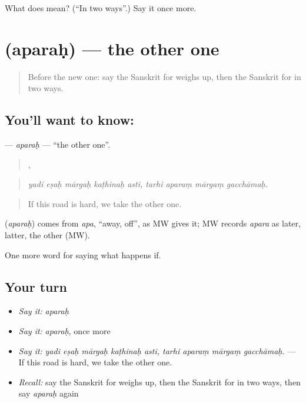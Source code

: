 \begin{tcolorbox}[breakable,colback=teal!4,colframe=teal!35!black,title={Before you move on}]
What does  mean? (\textquotedblleft{}In two ways\textquotedblright{}.) Say it once more.
\end{tcolorbox}
\section[\texorpdfstring{\sk{अपरः} (aparaḥ)}{अपरः (aparaḥ)}]{ (aparaḥ) — the other one}

\label{lesson:SA-C541-aparah}



\begin{quote}
Before the new one: say the Sanskrit for weighs up, then the Sanskrit for in two ways.
\end{quote}

\subsection*{You'll want to know: }
\textbf{} — \emph{aparaḥ} — \textquotedblleft{}the other one\textquotedblright{}.

\begin{quote}
    ,    
\end{quote}

\begin{quote}
\emph{yadi eṣaḥ mārgaḥ kaṭhinaḥ asti, tarhi aparaṃ mārgaṃ gacchāmaḥ.}
\end{quote}

\begin{quote}
If this road is hard, we take the other one.
\end{quote}

\begin{cousinweb}
\textbf{} (\emph{aparaḥ}) comes from \emph{apa}, \textquotedblleft{}away, off\textquotedblright{}, as MW gives it; MW records \emph{apara} as later, latter, the other (MW).
\end{cousinweb}

\begin{grammarlens}[title={What you've built}]
One more word for saying what happens if.
\end{grammarlens}

\subsection*{Your turn}
\begin{itemize}
\raggedright
  \item \emph{Say it:} \emph{aparaḥ}
  \item \emph{Say it:} \emph{aparaḥ}, once more
  \item \emph{Say it:} \emph{yadi eṣaḥ mārgaḥ kaṭhinaḥ asti, tarhi aparaṃ mārgaṃ gacchāmaḥ.} — If this road is hard, we take the other one.
  \item \emph{Recall:} say the Sanskrit for weighs up, then the Sanskrit for in two ways, then say \emph{aparaḥ} again
\end{itemize}

